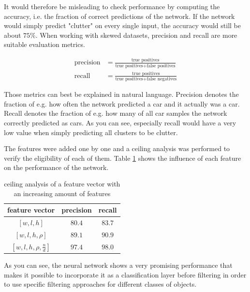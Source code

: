 It would therefore be misleading to check performance by computing the accuracy, i.e. the fraction of correct predictions of the network. If the network would simply predict "clutter" on every single input, the accuracy would still be about $75\%$. When working with skewed datasets, precision and recall are more suitable evaluation metrics.

\begin{equation}
     \begin{split}
         \text{precision} &= \frac{\text{true positives}}{\text{true positives} + \text{false positives}} \\
         \text{recall} &= \frac{\text{true positives}}{\text{true positives} + \text{false negatives}}
     \end{split}
\end{equation}

Those metrics can best be explained in natural language. Precision denotes the fraction of e.g. how often the network predicted a car and it actually was a car. Recall denotes the fraction of e.g. how many of all car samples the network correctly predicted as cars. As you can see, especially recall would have a very low value when simply predicting all clusters to be clutter.

The features were added one by one and a ceiling analysis was performed to verify the eligibility of each of them. Table \ref{table:ceiling_analysis} shows the influence of each feature on the performance of the network.

\begin{table}[H]
\centering
\begin{tabular}{ c | c c }
  feature vector & precision & recall \\
  \hline
  $[w, l, h]$ & $80.4$ & $83.7$ \\
  \hline
  $[w, l, h, \rho]$ & $89.1$ & $90.9$ \\
  \hline
  $[w, l, h, \rho, \frac{n}{d}]$ & $97.4$ & $98.0$
\end{tabular}
\vspace{10pt}
\caption{ceiling analysis of a feature vector with an increasing amount of features}
\label{table:ceiling_analysis}
\end{table}

As you can see, the neural network shows a very promising performance that makes it possible to incorporate it as a classification layer before filtering in order to use specific filtering approaches for different classes of objects.

